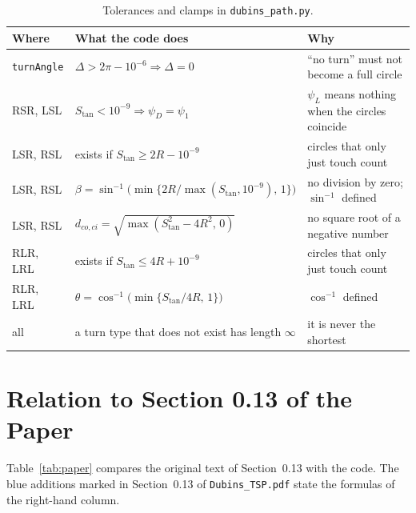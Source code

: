 \documentclass[10pt]{article}
\newcommand{\code}[1]{\texttt{#1}}
\newcommand{\Stan}{S_{\tan}}
\newcommand{\dcoci}{d_{co,ci}}
\newcommand{\Turn}{\Delta}
\begin{document}
\begin{table}[!htb]
\centering
\small
\caption{Tolerances and clamps in \code{dubins\_path.py}.}
\label{tab:guards}
\begin{tabular}{@{}l l l@{}}
\toprule
Where & What the code does & Why \\
\midrule
\code{turnAngle} & $\Turn > 2\pi - 10^{-6} \Rightarrow \Turn = 0$ & ``no turn'' must not become a full circle \\
RSR, LSL & $\Stan < 10^{-9} \Rightarrow \psi_D = \psi_1$ & $\psi_L$ means nothing when the circles coincide \\
LSR, RSL & exists if $\Stan \ge 2R - 10^{-9}$ & circles that only just touch count \\
LSR, RSL & $\beta = \sin^{-1}\bigl(\min\{2R / \max(\Stan, 10^{-9}),\, 1\}\bigr)$ & no division by zero; $\sin^{-1}$ defined \\
LSR, RSL & $\dcoci = \sqrt{\max(\Stan^2 - 4R^2,\, 0)}$ & no square root of a negative number \\
RLR, LRL & exists if $\Stan \le 4R + 10^{-9}$ & circles that only just touch count \\
RLR, LRL & $\theta = \cos^{-1}\bigl(\min\{\Stan / 4R,\, 1\}\bigr)$ & $\cos^{-1}$ defined \\
all & a turn type that does not exist has length $\infty$ & it is never the shortest \\
\bottomrule
\end{tabular}
\end{table}

\section{Relation to Section 0.13 of the Paper}

Table~\ref{tab:paper} compares the original text of Section~0.13 with the code. The blue additions marked in
Section~0.13 of \code{Dubins\_TSP.pdf} state the formulas of the right-hand column.
\end{document}
